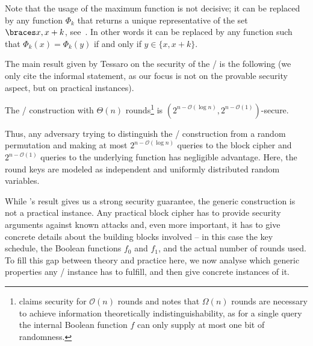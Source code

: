 {
    \label{bison:fig:WSN}
}

Note that the usage of the maximum function is not decisive; it can be replaced by any function $\Phi_k$ that returns a unique representative of the set $\set{x, x+k}$, see~\cite{AC:Tessaro15}.
In other words it can be replaced by any function such that $\Phi_k(x) = \Phi_k(y)$ if and only if  $y \in \{x,x+k\}$.

The main result given by Tessaro on the security of the \WSN/ is the following (we only cite the informal statement, as our focus is not on the provable security aspect, but on practical instances).
\begin{proposition}
    The \WSN/ construction with $\Theta(n)$ rounds\footnote{%
        \citeauthor{AC:Tessaro15} claims security for $\mathcal{O}(n)$ rounds and notes that $\Omega(n)$ rounds are necessary to achieve information theoretically indistinguishability, as for a single query the internal Boolean function $f$ can only supply at most one bit of randomness.
    } is $(2^{n-\mathcal{O}(\log n)}, 2^{n-\mathcal{O}(1)} )$-secure.
\end{proposition}
Thus, any adversary trying to distinguish the \WSN/ construction from a random permutation and making at most $2^{n-\mathcal{O}(\log n)}$ queries to the block cipher and $2^{n-\mathcal{O}(1)}$ queries to the underlying function has negligible advantage.
Here, the round keys are modeled as independent and uniformly distributed random variables.

While \citeauthor{AC:Tessaro15}'s result gives us a strong security guarantee, the generic construction is not a practical instance.
Any practical block cipher has to provide security arguments against known attacks and, even more important, it has to give concrete details about the building blocks involved -- in this case the key schedule, the Boolean functions $f_0$ and $f_1$, and the actual number of rounds used.
To fill this gap between theory and practice here, we now analyse which generic properties any \WSN/ instance has to fulfill, and then give concrete instances of it.

